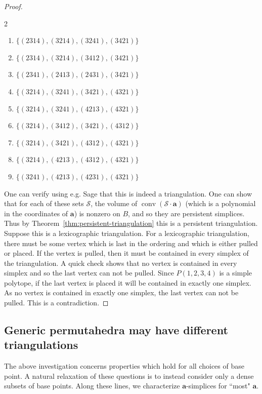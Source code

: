 \documentclass{amsart}
\theoremstyle{definition}
\def\ba{\mathbf{a}}
\def\cS{\mathcal{S}}
\DeclareMathOperator{\conv}{conv}
\begin{document}
\begin{proof}
\begin{multicols}{2}
\begin{enumerate}[label=$S_{\arabic*}$, itemsep=1pt]
    \item $\{(2314), (3214), (3241), (3421)\}$
    \item $\{(2314), (3214), (3412), (3421)\}$
    \item $\{(2341), (2413), (2431), (3421)\}$
    \item $\{(3214), (3241), (3421), (4321)\}$
    \item $\{(3214), (3241), (4213), (4321)\}$
    \item $\{(3214), (3412), (3421), (4312)\}$
    \item $\{(3214), (3421), (4312), (4321)\}$
    \item $\{(3214), (4213), (4312), (4321)\}$
    \item $\{(3241), (4213), (4231), (4321)\}$
\end{enumerate}
\end{multicols}

One can verify using e.g. Sage that this is indeed a triangulation. One can show that for each of these sets $\cS$, the volume of $\conv(\cS \cdot \ba)$ (which is a polynomial in the coordinates of $\ba$) is nonzero on $B$, and so they are persistent simplices. Thus by Theorem~\ref{thm:persistent-triangulation} this is a persistent triangulation. Suppose this is a lexicographic triangulation. For a lexicographic triangulation, there must be some vertex which is last in the ordering and which is either pulled or placed. If the vertex is pulled, then it must be contained in every simplex of the triangulation. A quick check shows that no vertex is contained in every simplex and so the last vertex can not be pulled. Since $P(1,2,3,4)$ is a simple polytope, if the last vertex is placed it will be contained in exactly one simplex. As no vertex is contained in exactly one simplex, the last vertex can not be pulled. This is a contradiction.
\end{proof}

\subsection{Generic permutahedra may have different triangulations}

The above investigation concerns properties which hold for all choices of base point. A natural relaxation of these questions is to instead consider only a dense subsets of base points. Along these lines, we characterize $\ba$-simplices for ``most" $\ba$.
\end{document}
